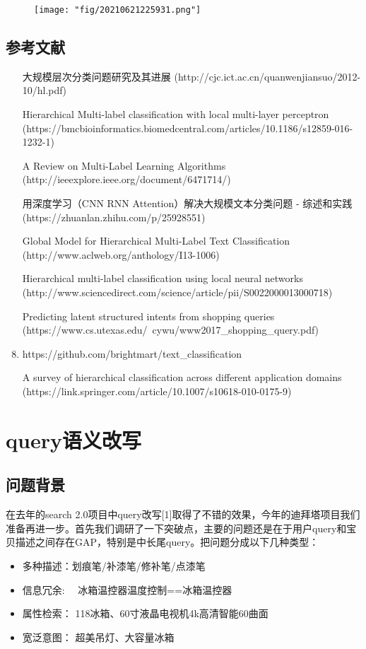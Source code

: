 \begin{figure}[!h]
	\centering
	\texttt{[image: "fig/20210621225931.png"]}
	\caption{}
	\label{fig:20210621225931}
\end{figure}



\subsection{参考文献}

\begin{enumerate}
\item [大规模层次分类问题研究及其进展](http://cjc.ict.ac.cn/quanwenjiansuo/2012-10/hl.pdf)
\item [Hierarchical Multi-label classification with local multi-layer perceptron](https://bmcbioinformatics.biomedcentral.com/articles/10.1186/s12859-016-1232-1)
\item [A Review on Multi-Label Learning Algorithms](http://ieeexplore.ieee.org/document/6471714/)
\item [用深度学习（CNN RNN Attention）解决大规模文本分类问题 - 综述和实践](https://zhuanlan.zhihu.com/p/25928551)
\item [Global Model for Hierarchical Multi-Label Text Classification](http://www.aclweb.org/anthology/I13-1006)
\item [Hierarchical multi-label classification using local neural networks](http://www.sciencedirect.com/science/article/pii/S0022000013000718)
\item [Predicting latent structured intents from shopping queries](https://www.cs.utexas.edu/~cywu/www2017\_shopping\_query.pdf)
\item https://github.com/brightmart/text\_classification
\item [A survey of hierarchical classification across different application domains](https://link.springer.com/article/10.1007/s10618-010-0175-9)
\end{enumerate}



\section{query语义改写}
\subsection{问题背景}
在去年的search 2.0项目中query改写[1]取得了不错的效果，今年的迪拜塔项目我们准备再进一步。首先我们调研了一下突破点，主要的问题还是在于用户query和宝贝描述之间存在GAP，特别是中长尾query。把问题分成以下几种类型：
\begin{itemize}
\item 多种描述：划痕笔/补漆笔/修补笔/点漆笔
\item 信息冗余:   冰箱温控器温度控制==冰箱温控器
\item 属性检索： 118冰箱、60寸液晶电视机4k高清智能60曲面
\item 宽泛意图： 超美吊灯、大容量冰箱
\end{itemize}

